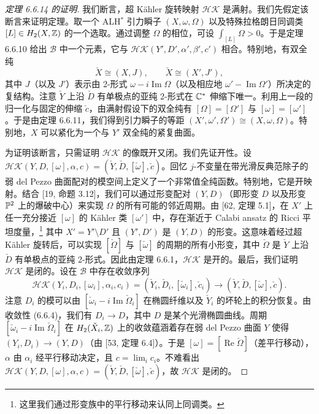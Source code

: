\begin{proof}[定理 6.6.14 的证明]
我们断言，超 Kähler 旋转映射 $\mathcal{HK}$ 是满射。我们先假定该断言来证明定理。取一个 ALH$^*$ 引力瞬子 $(X,\omega,\Omega)$ 以及特殊拉格朗日同调类 $[L]\in H_2(X,\mathbb{Z})$ 的一个选取。通过调整 $\Omega$ 的相位，可设 $\int_{[L]}\Omega>0$。于是定理 6.6.10 给出 $\mathcal{B}$ 中一个元素，它与 $\mathcal{HK}(Y',D',\alpha',\beta',c')$ 相合。特别地，有双全纯
\[
\check X\cong(X,J),\qquad \check X\cong(X',J'),
\]
其中 $J$（以及 $J'$）表示由 2-形式 $\omega-i\operatorname{Im}\Omega$（以及相应地 $\omega'-\operatorname{Im}\Omega'$）所决定的复结构。注意 $\check Y$ 上沿 $\check D$ 有单极点的亚纯 2-形式在 $\mathbb{C}^*$ 伸缩下唯一。利用上一段的归一化与固定的伸缩 $\check c$，由满射假设下的双全纯有 $[\Omega]=[\Omega']$ 与 $[\omega]=[\omega']$。于是由定理 6.6.11，我们得到引力瞬子的等距 $(X',\omega',\Omega')\cong(X,\omega,\Omega)$。特别地，$X$ 可以紧化为一个与 $Y'$ 双全纯的紧复曲面。

为证明该断言，只需证明 $\mathcal{HK}$ 的像既开又闭。我们先证开性。设 $\mathcal{HK}(Y,D,[\omega],\alpha,c)=(\check Y,\check D,[\check\omega],\check c)$。回忆 $j$-不变量在带光滑反典范除子的弱 del Pezzo 曲面配对的模空间上定义了一个非常值全纯函数。特别地，它是开映射。结合 [19, 命题 3.12]，我们可以通过形变配对 $(Y,D)$（即形变 $D$ 以及形变 $\mathbb{P}^2$ 上的爆破中心）来实现 $\Omega$ 的所有可能的邻近周期。由 [62, 定理 5.1]，在 $X'$ 上任一充分接近 $[\omega]$ 的 Kähler 类 $[\omega']$ 中，存在渐近于 Calabi ansatz 的 Ricci 平坦度量，\footnote{这里我们通过形变族中的平行移动来认同上同调类。} 其中 $X'=Y'\setminus D'$ 且 $(Y',D')$ 是 $(Y,D)$ 的形变。这意味着经过超 Kähler 旋转后，可以实现 $[\check\Omega]$ 与 $[\check\omega]$ 的周期的所有小形变，其中 $\check\Omega$ 是 $\check Y$ 上沿 $\check D$ 有单极点的亚纯 2-形式。因此由定理 6.6.1，$\mathcal{HK}$ 是开的。最后，我们证明 $\mathcal{HK}$ 是闭的。设在
$\mathcal{B}$ 中存在收敛序列
\begin{equation}
\mathcal{HK}(Y_i,D_i,[\omega_i],\alpha_i,c_i)=(\check Y_i,\check D_i,[\check\omega_i],\check c_i)\to(\check Y,\check D,[\check\omega],\check c). \tag{6.6.4}
\end{equation}
注意 $D_i$ 的模可以由 $[\check\omega_i-i\operatorname{Im}\check\Omega_i]$ 在椭圆纤维以及 $\check Y_i$ 的坏轮上的积分恢复。由收敛性 (6.6.4)，我们有 $D_i\to D$，其中 $D$ 是某个光滑椭圆曲线。周期 $[\check\omega_i-i\operatorname{Im}\check\Omega_i]$ 在 $H_2(\check X_i,\mathbb{Z})$ 上的收敛蕴涵着存在弱 del Pezzo 曲面 $Y$ 使得 $(Y_i,D_i)\to(Y,D)$（由 [53, 定理 6.4]）。于是 $[\omega]=[\operatorname{Re}\check\Omega]$（差平行移动），$\alpha$ 由 $\alpha_i$ 经平行移动决定，且 $c=\lim_i c_i$。不难看出 $\mathcal{HK}(Y,D,[\omega],\alpha,c)=(\check Y,\check D,[\check\omega],\check c)$，故 $\mathcal{HK}$ 是闭的。\proofend
\end{proof}

